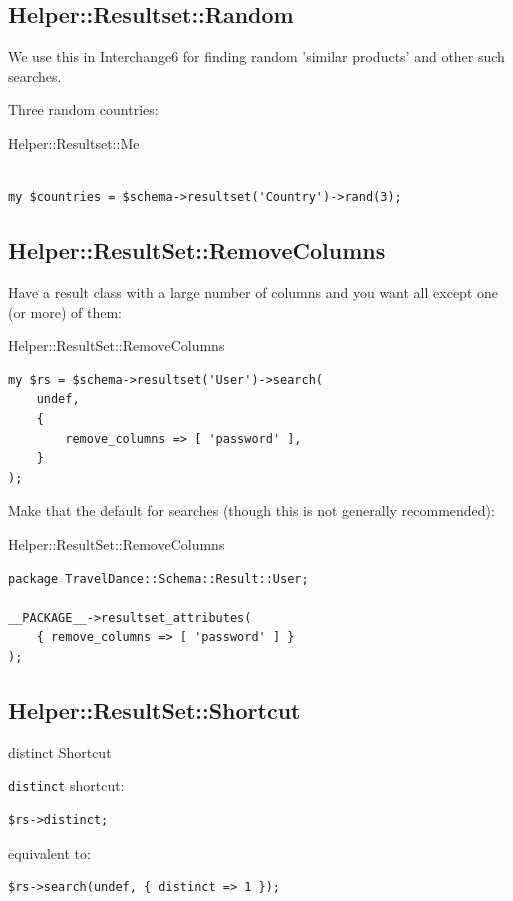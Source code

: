 \subsection{Helper::Resultset::Random}

We use this in Interchange6 for finding random 'similar products' and other
such searches.

Three random countries:

\begin{frame}[fragile]{Helper::Resultset::Me}
\begin{lstlisting}

my $countries = $schema->resultset('Country')->rand(3);

\end{lstlisting}
\end{frame}

\subsection{Helper::ResultSet::RemoveColumns}
Have a result class with a large number of columns and you want all except
one (or more) of them:

\begin{frame}[fragile]{Helper::ResultSet::RemoveColumns}
\begin{lstlisting}
my $rs = $schema->resultset('User')->search(
    undef,
    {
        remove_columns => [ 'password' ],
    }
);
\end{lstlisting}
\end{frame}

Make that the default for searches (though this is not generally recommended):

\begin{frame}[fragile]{Helper::ResultSet::RemoveColumns}
\begin{lstlisting}
package TravelDance::Schema::Result::User;

__PACKAGE__->resultset_attributes(
    { remove_columns => [ 'password' ] }
);
\end{lstlisting}
\end{frame}

\subsection{Helper::ResultSet::Shortcut}

\begin{frame}[fragile]{distinct Shortcut}

\verb|distinct| shortcut:

\begin{lstlisting}
$rs->distinct;
\end{lstlisting}

equivalent to:

\begin{lstlisting}
$rs->search(undef, { distinct => 1 });
\end{lstlisting}
\end{frame}

